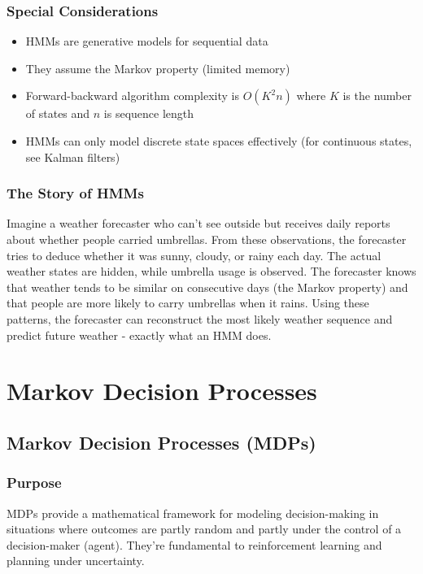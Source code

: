 \documentclass{article}
\begin{document}
\subsubsection{Special Considerations}
\begin{itemize}
    \item HMMs are generative models for sequential data
    \item They assume the Markov property (limited memory)
    \item Forward-backward algorithm complexity is $O(K^2n)$ where $K$ is the number of states and $n$ is sequence length
    \item HMMs can only model discrete state spaces effectively (for continuous states, see Kalman filters)
\end{itemize}

\subsubsection{The Story of HMMs}
Imagine a weather forecaster who can't see outside but receives daily reports about whether people carried umbrellas. From these observations, the forecaster tries to deduce whether it was sunny, cloudy, or rainy each day. The actual weather states are hidden, while umbrella usage is observed. The forecaster knows that weather tends to be similar on consecutive days (the Markov property) and that people are more likely to carry umbrellas when it rains. Using these patterns, the forecaster can reconstruct the most likely weather sequence and predict future weather - exactly what an HMM does.

\section{Markov Decision Processes}

\subsection{Markov Decision Processes (MDPs)}

\subsubsection{Purpose}
MDPs provide a mathematical framework for modeling decision-making in situations where outcomes are partly random and partly under the control of a decision-maker (agent). They're fundamental to reinforcement learning and planning under uncertainty.
\end{document}
